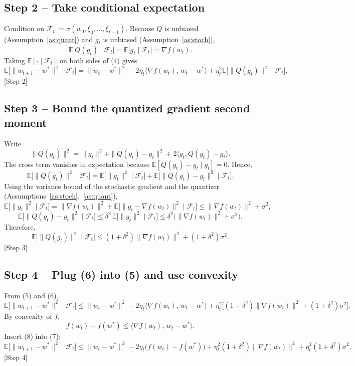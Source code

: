 \documentclass{article}
\newcommand{\E}{\mathbb{E}}
\begin{document}
\subsection*{Step 2 – Take conditional expectation}
Condition on $\mathcal{F}_t:=\sigma(w_0,\xi_0,\dots,\xi_{t-1})$.
Because $Q$ is unbiased (Assumption~\ref{as:quant}) and $g_t$ is unbiased (Assumption~\ref{as:stoch}),
\[
\E\!\big[Q(g_t)\mid\mathcal{F}_t\big]=\E\!\big[g_t\mid\mathcal{F}_t\big]=\nabla f(w_t).
\]
Taking $\E[\cdot\mid\mathcal{F}_t]$ on both sides of (4) gives
\[
\E\!\big[\|w_{t+1}-w^{*}\|^{2}\mid\mathcal{F}_t\big]
= \|w_{t}-w^{*}\|^{2}
-2\eta_t\langle \nabla f(w_t),\,w_{t}-w^{*}\rangle
+\eta_t^{2}\E\!\big[\|Q(g_t)\|^{2}\mid\mathcal{F}_t\big].
\tag{5}
\]
[Step 2]

\subsection*{Step 3 – Bound the quantized gradient second moment}
Write
\[
\|Q(g_t)\|^{2}= \|g_t\|^{2}+ \|Q(g_t)-g_t\|^{2}+2\langle g_t,Q(g_t)-g_t\rangle .
\]
The cross term vanishes in expectation because $\E[Q(g_t)-g_t\mid g_t]=0$. Hence,
\[
\E\!\big[\|Q(g_t)\|^{2}\mid\mathcal{F}_t\big]
= \E\!\big[\|g_t\|^{2}\mid\mathcal{F}_t\big]
+ \E\!\big[\|Q(g_t)-g_t\|^{2}\mid\mathcal{F}_t\big].
\]
Using the variance bound of the stochastic gradient and the quantizer (Assumptions~\ref{as:stoch},~\ref{as:quant}),
\[
\E\!\big[\|g_t\|^{2}\mid\mathcal{F}_t\big]
= \|\nabla f(w_t)\|^{2}+ \E\!\big[\|g_t-\nabla f(w_t)\|^{2}\mid\mathcal{F}_t\big]
\le \|\nabla f(w_t)\|^{2}+ \sigma^{2},
\]
\[
\E\!\big[\|Q(g_t)-g_t\|^{2}\mid\mathcal{F}_t\big]
\le \delta^{2}\,\E\!\big[\|g_t\|^{2}\mid\mathcal{F}_t\big]
\le \delta^{2}\big(\|\nabla f(w_t)\|^{2}+ \sigma^{2}\big).
\]
Therefore,
\[
\E\!\big[\|Q(g_t)\|^{2}\mid\mathcal{F}_t\big]
\le (1+\delta^{2})\|\nabla f(w_t)\|^{2}+ (1+\delta^{2})\sigma^{2}.
\tag{6}
\]
[Step 3]

\subsection*{Step 4 – Plug (6) into (5) and use convexity}
From (5) and (6),
\[
\E\!\big[\|w_{t+1}-w^{*}\|^{2}\mid\mathcal{F}_t\big]
\le \|w_{t}-w^{*}\|^{2}
-2\eta_t\langle \nabla f(w_t),\,w_{t}-w^{*}\rangle
+\eta_t^{2}\big[(1+\delta^{2})\|\nabla f(w_t)\|^{2}+ (1+\delta^{2})\sigma^{2}\big].
\tag{7}
\]
By convexity of $f$,
\[
f(w_t)-f(w^{*})\le \langle \nabla f(w_t),\,w_t-w^{*}\rangle .
\tag{8}
\]
Insert (8) into (7):
\[
\E\!\big[\|w_{t+1}-w^{*}\|^{2}\mid\mathcal{F}_t\big]
\le \|w_{t}-w^{*}\|^{2}
-2\eta_t\big(f(w_t)-f(w^{*})\big)
+\eta_t^{2}(1+\delta^{2})\|\nabla f(w_t)\|^{2}
+\eta_t^{2}(1+\delta^{2})\sigma^{2}.
\tag{9}
\]
[Step 4]
\end{document}
